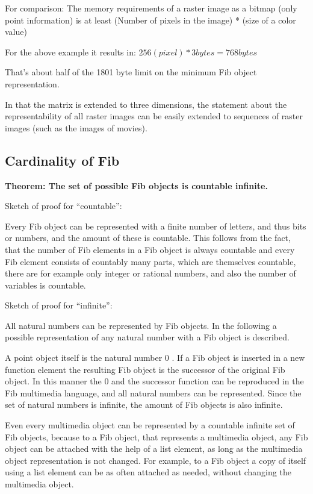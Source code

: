 \begin{flushleft}
\bigskip\noindent
For comparison: The memory requirements of a raster image as a bitmap (only point information) is at least
(Number of pixels in the image) * (size of a color value)

\bigskip\noindent
For the above example it results in: $256 (pixel) * 3 bytes = 768 bytes$

\bigskip\noindent
That's about half of the 1801 byte limit on the minimum Fib object representation.

\bigskip\noindent
In that the matrix is extended to three dimensions, the statement about the representability of all raster images can be easily extended to sequences of raster images (such as the images of movies).

\end{flushleft}


\subsection{Cardinality of Fib}

\textbf{Theorem: The set of possible Fib objects is countable infinite.}

\bigskip\noindent
Sketch of proof for ``countable'':

\noindent
Every Fib object can be represented with a finite number of letters, and thus bits or numbers, and the amount of these is countable.
This follows from the fact, that the number of Fib elements in a Fib object is always countable and every Fib element consists of countably many parts, which are themselves countable, there are for example only integer or rational numbers, and also the number of variables is countable.

\bigskip\noindent
Sketch of proof for ``infinite'':

\noindent
All natural numbers can be represented by Fib objects. In the following a possible representation of any natural number with a Fib object is described.

A point object itself is the natural number 0 .
If a Fib object is inserted in a new function element the resulting Fib object is the successor of the original Fib object.
In this manner the 0 and the successor function can be reproduced in the Fib multimedia language, and all natural numbers can be represented. Since the set of natural numbers is infinite, the amount of Fib objects is also infinite.

\bigskip\noindent
Even every multimedia object can be represented by a countable infinite set of Fib objects, because to a Fib object, that represents a multimedia object, any Fib object can be attached with the help of a list element, as long as the multimedia object representation is not changed. For example, to a Fib object a copy of itself using a list element can be as often attached as needed, without changing the multimedia object.


